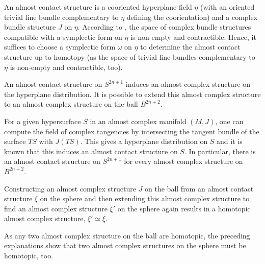 \begin{definition}
    An almost contact structure is a cooriented hyperplane field $\eta$ (with an oriented trivial line bundle complementary to $\eta$ defining the coorientation) 
    and a complex bundle structure $J$ on $\eta$.
    According to \cite[Prop 2.4.5]{Geiges08}, the space of complex bundle structures compatible with a symplectic form on $\eta$ is non-empty and contractible. 
    Hence, it suffices to choose a symplectic form $\omega$ on $\eta$ to determine the almost contact structure up to homotopy 
    (as the space of trivial line bundles complementary to $\eta$ is non-empty and contractible, too).
\end{definition}

An almost contact structure on $S^{2n+1}$ induces an almost complex structure on the hyperplane distribution.
It is possible to extend this almost complex structure to an almost complex structure on the ball $B^{2n+2}$.

For a given hypersurface $S$ in an almost complex manifold $(M, J)$, one can compute the field of complex tangencies by intersecting
the tangent bundle of the surface $TS$ with $J(TS)$. 
This gives a hyperplane distribution on $S$ and it is known that this induces an almost contact structure on $S$.
In particular, there is an almost contact structure on $S^{2n+1}$ for every almost complex structure on $B^{2n+2}$.

Constructing an almost complex structure $J$ on the ball from an almost contact structure $\xi$ on the sphere and then 
extending this almost complex structure to find an almost complex structure $\xi'$ on the sphere again results in a
homotopic almost complex structure, $\xi' \simeq \xi$.

As any two almost complex structure on the ball are homotopic, the preceding explanations show
that two almost complex structures on the sphere must be homotopic, too.